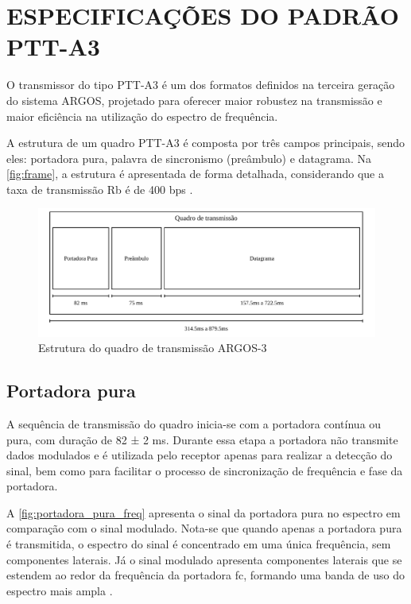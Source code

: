 \section{ESPECIFICAÇÕES DO PADRÃO PTT-A3}

O transmissor do tipo \gls{PTT-A3} é um dos formatos definidos na terceira geração do sistema \gls{ARGOS}, projetado para oferecer maior robustez na transmissão e maior eficiência na utilização do espectro de frequência. 

A estrutura de um quadro \gls{PTT-A3} é composta por três campos principais, sendo eles: portadora pura, palavra de sincronismo (preâmbulo) e datagrama. Na \autoref{fig:frame}, a estrutura é apresentada de forma detalhada, considerando que a taxa de transmissão \gls{Rb} é de 400 \gls{bps} \textcite{cnes_services_and_message_formats_ed2_rev2_2006}.

\begin{figure}[H]
	\centering
	\caption{Estrutura do quadro de transmissão ARGOS-3}\label{fig:frame}
	\includegraphics[width=\linewidth]{assets/cap2/frame.pdf}
\end{figure}

\subsection{Portadora pura}

A sequência de transmissão do quadro inicia-se com a portadora contínua ou pura, com duração de 82 ± 2 ms. Durante essa etapa a portadora não transmite dados modulados e é utilizada pelo receptor apenas para realizar a detecção do sinal, bem como para facilitar o processo de sincronização de frequência e fase da portadora. 

A \autoref{fig:portadora_pura_freq} apresenta o sinal da portadora pura no espectro em comparação com o sinal modulado. Nota-se que quando apenas a portadora pura é transmitida, o espectro do sinal é concentrado em uma única frequência, sem componentes laterais. Já o sinal modulado apresenta componentes laterais que se estendem ao redor da frequência da portadora \gls{fc}, formando uma banda de uso do espectro mais ampla \cite{cnes_services_and_message_formats_ed2_rev2_2006}.



